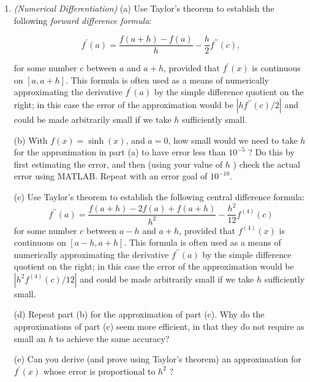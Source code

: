 \documentclass[../main.tex]{subfiles}
\begin{document}
\begin{enumerate}
(e) Prove identity (13).

Suggestion: For part (d), use the trig identity:
$$
\tan (A \pm B)=\frac{\tan A \pm \tan B}{1 \mp \tan A \tan B}
$$
to calculate first $\tan \left(2 \tan ^{-1} \frac{1}{5}\right)$, then $\tan \left(4 \tan ^{-1} \frac{1}{5}\right)$, and finally $\tan \left(4 \tan ^{-1} \frac{1}{5}-\tan ^{-1} \frac{1}{239}\right)$.\\

HISTORICAL ASIDE: Since antiquity, the problem of figuring out $\pi$ to more and more decimals has challenged the mathematical world, and in more recent times the computer world as well. Such tasks can test the powers of computers as well as the methods used to compute them. Even in the 1970 s $\pi$ had been calculated to over 1 million places, and this breakthrough was accomplished using an identity quite similar to (13). See [Bec-71] for an enlightening account of this very interesting history.

\item \emph{(Numerical Differentiation)} (a) Use Taylor's theorem to establish the following \emph{forward difference formula}:

$$
f^{\prime}(a)=\frac{f(a+h)-f(a)}{h}-\frac{h}{2} f^{\prime \prime}(c),
$$

for some number $c$ between $a$ and $a+h$, provided that $f^{\prime}(x)$ is continuous on $[a, a+h]$. This formula is often used as a means of numerically approximating the derivative $f^{\prime}(a)$ by the simple difference quotient on the right; in this case the error of the approximation would be $\left|h f^{\prime \prime}(c) / 2\right|$ and could be made arbitrarily small if we take $h$ sufficiently small.

(b) With $f(x)=\sinh (x)$, and $a=0$, how small would we need to take $h$ for the approximation in part (a) to have error less than $10^{-5}$ ? Do this by first estimating the error, and then (using your value of $h$ ) check the actual error using MATLAB. Repeat with an error goal of $10^{-10}$.

(c) Use Taylor's theorem to establish the following central difference formula:
$$
f^{\prime \prime}(a)=\frac{f(a+h)-2 f(a)+f(a+h)}{h^{2}}-\frac{h^{2}}{12} f^{(4)}(c)
$$
for some number $c$ between $a-h$ and $a+h$, provided that $f^{(4)}(x)$ is continuous on $[a-h, a+h]$. This formula is often used as a means of numerically approximating the derivative $f^{\prime \prime}(a)$ by the simple difference quotient on the right; in this case the error of the approximation would be $\left|h^{2} f^{(4)}(c) / 12\right|$ and could be made arbitrarily small if we take $h$ sufficiently small.

(d) Repeat part (b) for the approximation of part (c). Why do the approximations of part (c) seem more efficient, in that they do not require as small an $h$ to achieve the same accuracy?

(e) Can you derive (and prove using Taylor's theorem) an approximation for $f^{\prime}(x)$ whose error is proportional to $h^{2}$ ?

\end{enumerate}
\end{document}
